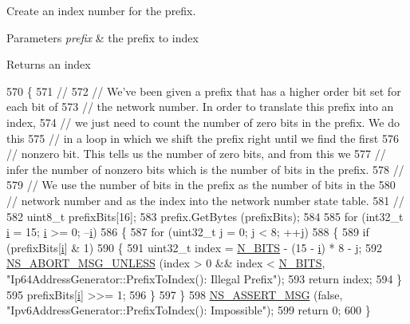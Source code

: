 Create an index number for the prefix. 


\begin{DoxyParams}{Parameters}
{\em prefix} & the prefix to index \\
\hline
\end{DoxyParams}
\begin{DoxyReturn}{Returns}
an index 
\end{DoxyReturn}

\begin{DoxyCode}
570 \{
571   \textcolor{comment}{//}
572   \textcolor{comment}{// We've been given a prefix that has a higher order bit set for each bit of}
573   \textcolor{comment}{// the network number.  In order to translate this prefix into an index,}
574   \textcolor{comment}{// we just need to count the number of zero bits in the prefix.  We do this}
575   \textcolor{comment}{// in a loop in which we shift the prefix right until we find the first}
576   \textcolor{comment}{// nonzero bit.  This tells us the number of zero bits, and from this we}
577   \textcolor{comment}{// infer the number of nonzero bits which is the number of bits in the prefix.}
578   \textcolor{comment}{//}
579   \textcolor{comment}{// We use the number of bits in the prefix as the number of bits in the}
580   \textcolor{comment}{// network number and as the index into the network number state table.}
581   \textcolor{comment}{//}
582   uint8\_t prefixBits[16];
583   prefix.GetBytes (prefixBits);
584 
585   \textcolor{keywordflow}{for} (int32\_t \hyperlink{bernuolliDistribution_8m_a6f6ccfcf58b31cb6412107d9d5281426}{i} = 15; \hyperlink{bernuolliDistribution_8m_a6f6ccfcf58b31cb6412107d9d5281426}{i} >= 0; --\hyperlink{bernuolliDistribution_8m_a6f6ccfcf58b31cb6412107d9d5281426}{i})
586     \{
587       \textcolor{keywordflow}{for} (uint32\_t j = 0; j < 8; ++j)
588         \{
589           \textcolor{keywordflow}{if} (prefixBits[\hyperlink{bernuolliDistribution_8m_a6f6ccfcf58b31cb6412107d9d5281426}{i}] & 1)
590             \{
591               uint32\_t index = \hyperlink{classns3_1_1Ipv6AddressGeneratorImpl_abe99ce1055f3a7de9263da1d34ef2629}{N\_BITS} - (15 - \hyperlink{bernuolliDistribution_8m_a6f6ccfcf58b31cb6412107d9d5281426}{i}) * 8 - j;
592               \hyperlink{group__fatal_ga0bd3f62c55e7347ff814572f3aaa3864}{NS\_ABORT\_MSG\_UNLESS} (index > 0 && index < 
      \hyperlink{classns3_1_1Ipv6AddressGeneratorImpl_abe99ce1055f3a7de9263da1d34ef2629}{N\_BITS}, \textcolor{stringliteral}{"Ip64AddressGenerator::PrefixToIndex(): Illegal Prefix"});
593               \textcolor{keywordflow}{return} index;
594             \}
595           prefixBits[\hyperlink{bernuolliDistribution_8m_a6f6ccfcf58b31cb6412107d9d5281426}{i}] >>= 1;
596         \}
597     \}
598   \hyperlink{assert_8h_aff5ece9066c74e681e74999856f08539}{NS\_ASSERT\_MSG} (\textcolor{keyword}{false}, \textcolor{stringliteral}{"Ipv6AddressGenerator::PrefixToIndex(): Impossible"});
599   \textcolor{keywordflow}{return} 0;
600 \}
\end{DoxyCode}


